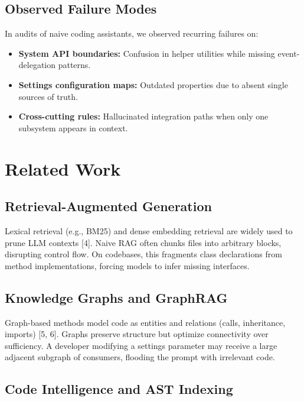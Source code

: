 \documentclass[11pt]{article}
\providecommand{\tightlist}{%
  \setlength{\itemsep}{2pt}%
  \setlength{\parskip}{0pt}%
}
\begin{document}
\subsection{Observed Failure Modes}\label{observed-failure-modes}

In audits of naive coding assistants, we observed recurring failures on:

\begin{itemize}
\tightlist
\item
  \textbf{System API boundaries:} Confusion in helper utilities while
  missing event-delegation patterns.
\item
  \textbf{Settings configuration maps:} Outdated properties due to
  absent single sources of truth.
\item
  \textbf{Cross-cutting rules:} Hallucinated integration paths when only
  one subsystem appears in context.
\end{itemize}

\section{Related Work}\label{related-work}

\subsection{Retrieval-Augmented
Generation}\label{retrieval-augmented-generation}

Lexical retrieval (e.g., BM25) and dense embedding retrieval are widely
used to prune LLM contexts {[}4{]}. Naive RAG often chunks files into
arbitrary blocks, disrupting control flow. On codebases, this fragments
class declarations from method implementations, forcing models to infer
missing interfaces.

\subsection{Knowledge Graphs and
GraphRAG}\label{knowledge-graphs-and-graphrag}

Graph-based methods model code as entities and relations (calls,
inheritance, imports) {[}5, 6{]}. Graphs preserve structure but optimize
connectivity over sufficiency. A developer modifying a settings
parameter may receive a large adjacent subgraph of consumers, flooding
the prompt with irrelevant code.

\subsection{Code Intelligence and AST
Indexing}\label{code-intelligence-and-ast-indexing}
\end{document}
